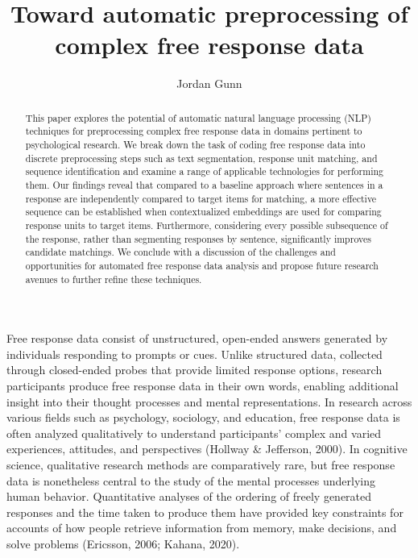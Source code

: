 \documentclass[
  letterpaper,
  DIV=11,
  numbers=noendperiod]{scrreprt}
\title{Toward automatic preprocessing of complex free response data}
\author{Jordan Gunn}
\date{}
\renewcommand*\contentsname{Table of contents}
\newcommand\contentsname{Table of contents}
\begin{document}
\maketitle
\begin{abstract}
This paper explores the potential of automatic natural language
processing (NLP) techniques for preprocessing complex free response data
in domains pertinent to psychological research. We break down the task
of coding free response data into discrete preprocessing steps such as
text segmentation, response unit matching, and sequence identification
and examine a range of applicable technologies for performing them. Our
findings reveal that compared to a baseline approach where sentences in
a response are independently compared to target items for matching, a
more effective sequence can be established when contextualized
embeddings are used for comparing response units to target items.
Furthermore, considering every possible subsequence of the response,
rather than segmenting responses by sentence, significantly improves
candidate matchings. We conclude with a discussion of the challenges and
opportunities for automated free response data analysis and propose
future research avenues to further refine these techniques.
\end{abstract}
\ifdefined\Shaded\renewenvironment{Shaded}{\begin{tcolorbox}[interior hidden, enhanced, borderline west={3pt}{0pt}{shadecolor}, boxrule=0pt, breakable, sharp corners, frame hidden]}{\end{tcolorbox}}\fi

\renewcommand*\contentsname{Table of contents}
{
\hypersetup{linkcolor=}
\setcounter{tocdepth}{2}
\tableofcontents
}

\hypertarget{section}{%
\chapter{}\label{section}}

Free response data consist of unstructured, open-ended answers generated
by individuals responding to prompts or cues. Unlike structured data,
collected through closed-ended probes that provide limited response
options, research participants produce free response data in their own
words, enabling additional insight into their thought processes and
mental representations. In research across various fields such as
psychology, sociology, and education, free response data is often
analyzed qualitatively to understand participants' complex and varied
experiences, attitudes, and perspectives (Hollway \& Jefferson, 2000).
In cognitive science, qualitative research methods are comparatively
rare, but free response data is nonetheless central to the study of the
mental processes underlying human behavior. Quantitative analyses of the
ordering of freely generated responses and the time taken to produce
them have provided key constraints for accounts of how people retrieve
information from memory, make decisions, and solve problems (Ericsson,
2006; Kahana, 2020).
\end{document}
